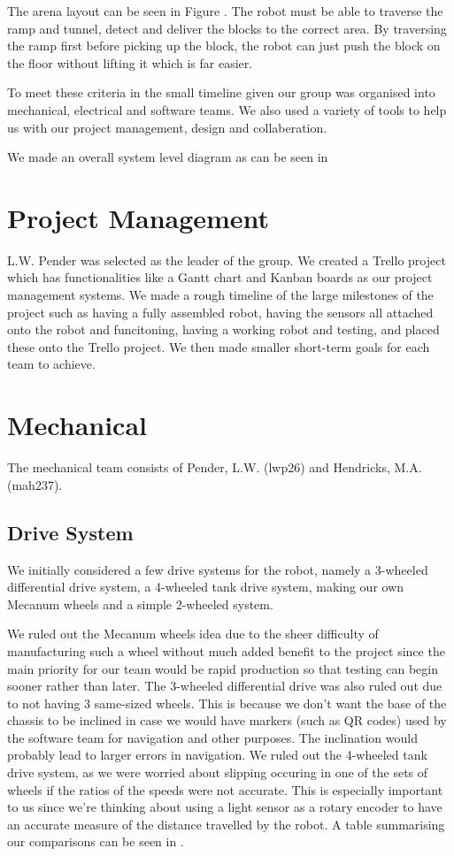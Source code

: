 \documentclass{article}
\begin{document}
\quad The arena layout can be seen in Figure . The robot must be able to traverse the ramp and tunnel, detect and deliver the blocks to the correct area. By traversing the ramp first before picking up the block, the robot can just push the block on the floor without lifting it which is far easier.

\quad To meet these criteria in the small timeline given our group was organised into mechanical, electrical and software teams. We also used a variety of tools to help us with our project management, design and collaberation.

\quad We made an overall system level diagram as can be seen in 

\section{Project Management}
\quad L.W. Pender was selected as the leader of the group. We created a Trello project which has functionalities like a Gantt chart and Kanban boards as our project management systems. We made a rough timeline of the large milestones of the project such as having a fully assembled robot, having the sensors all attached onto the robot and funcitoning, having a working robot and testing, and placed these onto the Trello project. We then made smaller short-term goals for each team to achieve.
    
\section{Mechanical}
\quad The mechanical team consists of Pender, L.W. (lwp26) and Hendricks, M.A. (mah237). 

\subsection{Drive System}
\quad \quad We initially considered a few drive systems for the robot, namely a 3-wheeled differential drive system, a 4-wheeled tank drive system, making our own Mecanum wheels and a simple 2-wheeled system. 

\quad We ruled out the Mecanum wheels idea due to the sheer difficulty of manufacturing such a wheel without much added benefit to the project since the main priority for our team would be rapid production so that testing can begin sooner rather than later. The 3-wheeled differential drive was also ruled out due to not having 3 same-sized wheels. This is because we don't want the base of the chassis to be inclined in case we would have markers (such as QR codes) used by the software team for navigation and other purposes. The inclination would probably lead to larger errors in navigation. We ruled out the 4-wheeled tank drive system, as we were worried about slipping occuring in one of the sets of wheels if the ratios of the speeds were not accurate. This is especially important to us since we're thinking about using a light sensor as a rotary encoder to have an accurate measure of the distance travelled by the robot. A table summarising our comparisons can be seen in .
\end{document}
